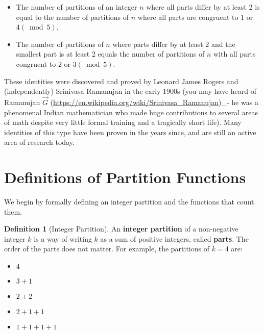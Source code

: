 \documentclass{article}
\theoremstyle{definition}
\newtheorem{definition}{Definition}
\begin{document}
\begin{itemize}
  \item The number of partitions of an integer $n$ where all parts differ by at least 2 is equal to the number of partitions of $n$ where all parts are congruent to 1 or $4(\bmod 5)$.
  \item The number of partitions of $n$ where parts differ by at least 2 and the smallest part is at least 2 equals the number of partitions of $n$ with all parts congruent to 2 or $3(\bmod 5)$.
\end{itemize}

These identities were discovered and proved by Leonard James Rogers and (independently) Srinivasa Ramanujan in the early 1900s (you may have heard of Ramanujan $\vec{G}$ (\href{https://en.wikipedia.org/wiki/Srinivasa_Ramanujan}{https://en.wikipedia.org/wiki/Srinivasa\_Ramanujan})\_- he was a phenomenal Indian mathematician who made huge contributions to several areas of math despite very little formal training and a tragically short life). Many identities of this type have been proven in the years since, and are still an active area of research today.









\newpage



\begin{abstract}
  This document provides formal definitions for several integer partition functions, introduces their associated ordinary generating functions, and presents a proof for a fundamental duality theorem that connects two distinct types of restricted partitions.
\end{abstract}

\section{Definitions of Partition Functions}

We begin by formally defining an integer partition and the functions that count them.

\begin{definition}[Integer Partition]
  An \textbf{integer partition} of a non-negative integer $k$ is a way of writing $k$ as a sum of positive integers, called \textbf{parts}. The order of the parts does not matter. For example, the partitions of $k=4$ are:
  \begin{itemize}
    \item $4$
    \item $3+1$
    \item $2+2$
    \item $2+1+1$
    \item $1+1+1+1$
  \end{itemize}
\end{definition}
\end{document}
